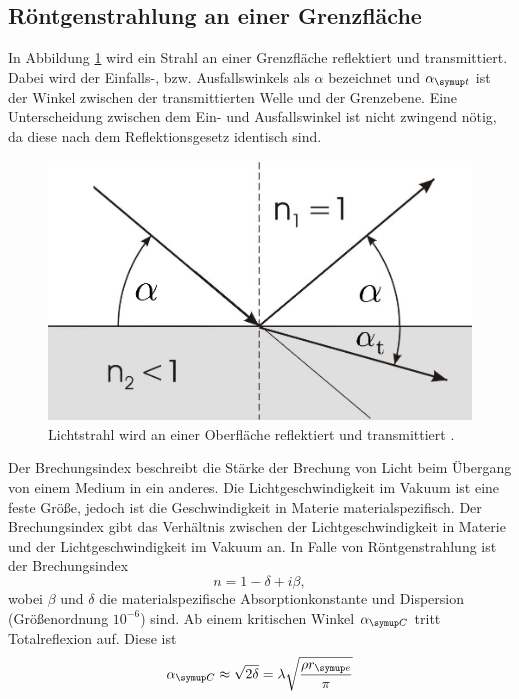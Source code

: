 \subsection{Röntgenstrahlung an einer Grenzfläche}
In Abbildung \ref{fig:reflection_transmission} wird ein Strahl an einer Grenzfläche reflektiert und transmittiert. Dabei 
wird der Einfalls-, bzw. Ausfallswinkels als $\alpha$ bezeichnet und $\alpha\idx{t}$ ist der Winkel zwischen der transmittierten Welle und der Grenzebene.
Eine Unterscheidung zwischen dem Ein- und Ausfallswinkel ist 
nicht zwingend nötig, da diese nach dem Reflektionsgesetz identisch sind.
\begin{figure}[H]
  \centering
  \includegraphics[scale=0.25]{rt.JPG}
  \caption{Lichtstrahl wird an einer Oberfläche reflektiert und transmittiert \cite{uni_giessen}.}
  \label{fig:reflection_transmission}
\end{figure} 
\noindent
Der Brechungsindex beschreibt die Stärke der Brechung von Licht
beim Übergang von einem Medium in ein anderes. Die Lichtgeschwindigkeit im Vakuum
ist eine feste Größe, jedoch ist die Geschwindigkeit in Materie materialspezifisch. Der
Brechungsindex gibt das Verhältnis zwischen der Lichtgeschwindigkeit in Materie und
der Lichtgeschwindigkeit im Vakuum an.
In Falle von Röntgenstrahlung ist der Brechungsindex
\begin{equation}
  n= 1 - \delta + i \beta , 
\end{equation}
wobei $\beta$ und $\delta$ die materialspezifische Absorptionkonstante und Dispersion (Größenordnung $10^{-6}$) sind.
Ab einem kritischen Winkel $\alpha\idx{C}$ tritt Totalreflexion auf. Diese ist 
\begin{equation}
  \alpha\idx{C} \approx \sqrt{2 \delta} = \lambda \sqrt{\frac{\rho r\idx{e}}{\pi}}
  \label{eq:kritisch}
\end{equation}
